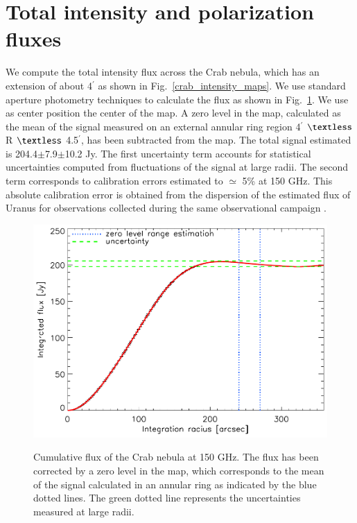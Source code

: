 \documentclass[twocolumn,traditabstract]{aa}
\begin{document}
\section{Total intensity and polarization fluxes}\label{sec:Polarization estimates in CMB experiments like beams}
We compute the total intensity flux across the Crab nebula, which has an extension of about  4$^{\prime}$ as shown in Fig.~\ref{crab_intensity_maps}.
We use standard aperture photometry techniques to calculate the flux as shown in Fig.~\ref{crab_integrated_flux}. We use as center position the center of the map. A zero level in the map, calculated as the mean of the signal measured on an external annular ring region 4$^\prime$ $\textless$  R $\textless$ 4.5$^\prime$, has been subtracted from the map. The total signal estimated is 204.4$\pm$7.9$\pm$10.2 Jy. The first uncertainty term accounts for statistical uncertainties computed from fluctuations of the signal at large radii. The second term corresponds to calibration errors estimated to $\simeq$ 5\% at 150 GHz. This absolute calibration error is obtained from the dispersion of the estimated flux of Uranus for observations collected during the same observational campaign \citep{ritacco2017}.

\begin{figure}[h!]
  \centering
     { \includegraphics[width=0.85\linewidth,keepaspectratio]{figures/Crab_integrated_flux_2mm.pdf}}
     \caption{Cumulative flux of the Crab nebula at 150 GHz. The flux has been corrected by a zero level in the map, which corresponds to the mean of the signal calculated in an annular ring as indicated by the blue dotted lines. The green dotted line represents the uncertainties measured at large radii.}
\label{crab_integrated_flux}
\end{figure}
\end{document}
